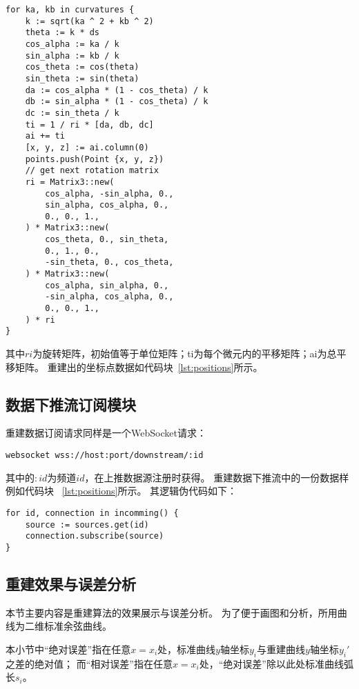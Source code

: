 \begin{lstlisting}[caption={曲线重建}]
for ka, kb in curvatures {
    k := sqrt(ka ^ 2 + kb ^ 2)
    theta := k * ds
    cos_alpha := ka / k
    sin_alpha := kb / k
    cos_theta := cos(theta)
    sin_theta := sin(theta)
    da := cos_alpha * (1 - cos_theta) / k
    db := sin_alpha * (1 - cos_theta) / k
    dc := sin_theta / k
    ti = 1 / ri * [da, db, dc]
    ai += ti
    [x, y, z] := ai.column(0)
    points.push(Point {x, y, z})
    // get next rotation matrix
    ri = Matrix3::new(
        cos_alpha, -sin_alpha, 0.,
        sin_alpha, cos_alpha, 0.,
        0., 0., 1.,
    ) * Matrix3::new(
        cos_theta, 0., sin_theta,
        0., 1., 0.,
        -sin_theta, 0., cos_theta,
    ) * Matrix3::new(
        cos_alpha, sin_alpha, 0.,
        -sin_alpha, cos_alpha, 0.,
        0., 0., 1.,
    ) * ri
}
\end{lstlisting}

其中$ri$为旋转矩阵，初始值等于单位矩阵；ti为每个微元内的平移矩阵；ai为总平移矩阵。
重建出的坐标点数据如代码块~\ref{lst:positions}所示。

\subsection{数据下推流订阅模块}

重建数据订阅请求同样是一个WebSocket请求：

\begin{lstlisting}[label={lst:subscribe},caption={重建数据订阅}]
websocket wss://host:port/downstream/:id
\end{lstlisting}

其中的$:id$为频道$id$，在上推数据源注册时获得。
重建数据下推流中的一份数据样例如代码块 ~\ref{lst:positions}所示。
其逻辑伪代码如下：

\begin{lstlisting}[caption={订阅数据源}]
for id, connection in incomming() {
    source := sources.get(id)
    connection.subscribe(source)
}
\end{lstlisting}

\subsection{重建效果与误差分析}
\label{sec:error-analyze}

本节主要内容是重建算法的效果展示与误差分析。
为了便于画图和分析，所用曲线为二维标准余弦曲线。

本小节中“绝对误差”指在任意$x=x_i$处，标准曲线$y$轴坐标$y_i$与重建曲线$y$轴坐标$y_i'$之差的绝对值；
而“相对误差”指在任意$x=x_i$处，“绝对误差”除以此处标准曲线弧长$s_i$。

